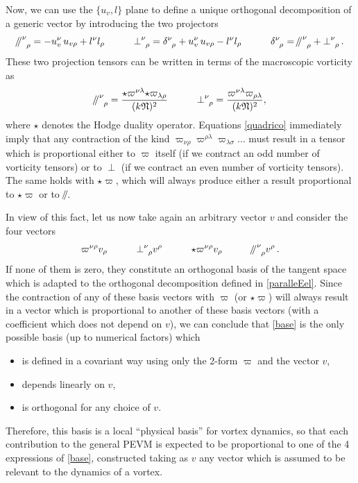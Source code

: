 \documentclass[preprints,article,accept,moreauthors,pdftex]{mdpi}
\newcommand{\spc}{\quad \quad \quad}
\newcommand{\paral}{\mathbin{\!/\mkern-5mu/\!}}
\begin{document}
Now, we can use the $\{ u_v, l \}$ plane to define a unique orthogonal decomposition of a generic vector by introducing the two projectors
\begin{equation}\label{paralleEel}
{\paral \,}\indices{^\nu _\rho} = -u_v^\nu \, u_{v\rho} + l^\nu l_\rho 
\spc
{\perp}\indices{^\nu _\rho} = \delta\indices{^\nu_\rho} +u_v^\nu \,u_{v\rho} - l^\nu l_\rho
\spc
\delta\indices{^\nu _\rho} = {\paral \,}\indices{^\nu _\rho} + {\perp}\indices{^\nu _\rho}
\, .
\end{equation}
These two projection tensors can be written in terms of the macroscopic vorticity as~\citep{langlois98,GavassinoGeometria}
\begin{equation}\label{quadrico}
{\paral \,}\indices{^\nu _\rho} = \dfrac{\star \varpi^{\nu \lambda} {\star} \varpi_{\lambda \rho}}{(k\mathfrak{N})^2}  \spc {\perp}\indices{^\nu _\rho}  = \dfrac{ \varpi^{\nu \lambda}  \varpi_{ \rho  \lambda}}{(k\mathfrak{N})^2}  ,
\end{equation} 
where $\star$ denotes the Hodge duality operator. 
Equations \eqref{quadrico} immediately imply that any contraction of the kind $\varpi_{\nu \rho}\varpi^{\rho \lambda} \varpi_{\lambda \sigma}...$ must result in a tensor which is proportional either to $\varpi$ itself (if we contract an odd number of vorticity tensors) or to ${\perp}$ (if we contract an even number of vorticity tensors). 
The same holds with $\star \varpi$, which will always produce either a result proportional to $\star \varpi$ or to ${\paral}$.

In view of this fact, let us now take again an arbitrary vector $v$ and consider the four vectors
\begin{equation}\label{base}
\varpi^{\nu \rho}v_\rho 
\spc {\perp}\indices{^\nu _\rho} v^\rho 
\spc {\star} \varpi^{\nu \rho}v_\rho 
\spc {\paral \,}\indices{^\nu _\rho} v^\rho  \,  .
\end{equation}
If none of them is zero, they constitute an orthogonal basis of the tangent space which is adapted to the orthogonal decomposition defined in \eqref{paralleEel}. 
Since the contraction of any of these basis vectors with $\varpi$ (or $\star \varpi$) will always result in a vector which is proportional to another of these basis vectors (with a coefficient which does not depend on $v$), we can conclude that \eqref{base} is the only possible basis (up to numerical factors) which 
\begin{itemize}
\item is defined in a covariant way using only the 2-form $\varpi$ and the vector $v$, 
\item depends linearly on $v$,
\item is orthogonal for any choice of $v$.
\end{itemize}
Therefore, this basis is a local ``physical basis'' for vortex dynamics, so that each contribution to the general PEVM is expected to be proportional to one of the 4 expressions of \eqref{base}, constructed taking as $v$ any vector which is assumed to be relevant to the dynamics of a vortex. 
\end{document}
